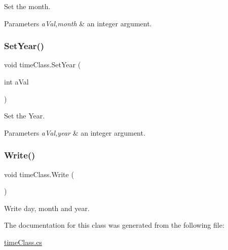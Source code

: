 Set the month. 


\begin{DoxyParams}{Parameters}
{\em a\+Val,month} & an integer argument. \\
\hline
\end{DoxyParams}
\mbox{\label{classtime_class_a79d58ba7b93a061a0275fc5f0b70285c}} 
\subsubsection{\texorpdfstring{SetYear()}{SetYear()}}
{\footnotesize\ttfamily void time\+Class.\+Set\+Year (\begin{DoxyParamCaption}\item[{int}]{a\+Val }\end{DoxyParamCaption})\hspace{0.3cm}{\ttfamily [inline]}}



Set the Year. 


\begin{DoxyParams}{Parameters}
{\em a\+Val,year} & an integer argument. \\
\hline
\end{DoxyParams}
\mbox{\label{classtime_class_a5d91f0093fdb3f9c16dbd945703e0725}} 
\subsubsection{\texorpdfstring{Write()}{Write()}}
{\footnotesize\ttfamily void time\+Class.\+Write (\begin{DoxyParamCaption}{ }\end{DoxyParamCaption})\hspace{0.3cm}{\ttfamily [inline]}}



Write day, month and year. 



The documentation for this class was generated from the following file\+:\begin{DoxyCompactItemize}
\item 
\mbox{\hyperlink{time_class_8cs}{time\+Class.\+cs}}\end{DoxyCompactItemize}
